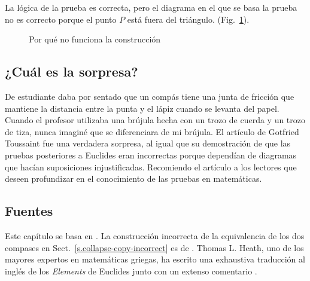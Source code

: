 La lógica de la prueba es correcta, pero el diagrama en el que se basa la prueba no es correcto porque el punto $P$ está fuera del triángulo. (Fig.~\ref{f.collapse-isoceles-2}).

\begin{figure}[b]
\begin{center}
\caption{Por qué no funciona la construcción}\label{f.collapse-isoceles-2}
\end{center}
\end{figure}

\subsection*{¿Cuál es la sorpresa?}

De estudiante daba por sentado que un compás tiene una junta de fricción que mantiene la distancia entre la punta y el lápiz cuando se levanta del papel. Cuando el profesor utilizaba una brújula hecha con un trozo de cuerda y un trozo de tiza, nunca imaginé que se diferenciara de mi brújula. El artículo de Gotfried Toussaint fue una verdadera sorpresa, al igual que su demostración de que las pruebas posteriores a Euclides eran incorrectas porque dependían de diagramas que hacían suposiciones injustificadas. Recomiendo el artículo a los lectores que deseen profundizar en el conocimiento de las pruebas en matemáticas.

\subsection*{Fuentes}

Este capítulo se basa en \cite{toussaint}. La construcción incorrecta de la equivalencia de los dos compases en Sect.~\ref{s.collapse-copy-incorrect} es de \cite{rusty}. Thomas L. Heath, uno de los mayores expertos en matemáticas griegas, ha escrito una exhaustiva traducción al inglés de los \textit{Elements} de Euclides junto con un extenso comentario \cite{euclid}.
